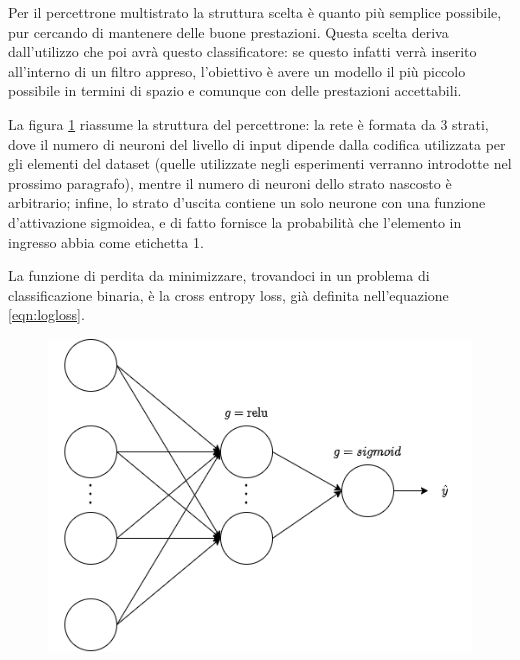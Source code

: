 \documentclass[../../main.tex]{subfiles}
\begin{document}
    Per il percettrone multistrato la struttura scelta è quanto più semplice possibile, pur cercando di mantenere delle buone prestazioni. Questa scelta deriva dall'utilizzo che poi avrà questo classificatore: se questo infatti verrà inserito all'interno di un filtro appreso, l'obiettivo è avere un modello il più piccolo possibile in termini di spazio e comunque con delle prestazioni accettabili.

    La figura \ref{fig:strutturaPercettrone} riassume la struttura del percettrone: la rete è formata da 3 strati, dove il numero di neuroni del livello di input dipende dalla codifica utilizzata per gli elementi del dataset (quelle utilizzate negli esperimenti verranno introdotte nel prossimo paragrafo), mentre il numero di neuroni dello strato nascosto è arbitrario; infine, lo strato d'uscita contiene un solo neurone con una funzione d'attivazione sigmoidea, e di fatto fornisce la probabilità che l'elemento in ingresso abbia come etichetta 1.

    La funzione di perdita da minimizzare, trovandoci in un problema di classificazione binaria, è la cross entropy loss, già definita nell'equazione \ref{eqn:logloss}.

    \begin{figure}[H]
        \centering
        \includegraphics[width=\textwidth]{immagini/6_4/percettroneStruttura.drawio.png}
        \caption{}
        \label{fig:strutturaPercettrone}
    \end{figure}
\end{document}
